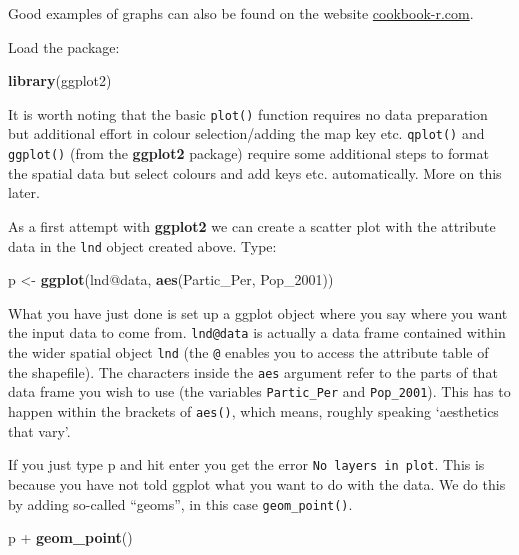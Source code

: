 \documentclass[]{article}
\newenvironment{Shaded}{}{}
\newcommand{\KeywordTok}[1]{\textcolor[rgb]{0.00,0.44,0.13}{\textbf{{#1}}}}
\newcommand{\StringTok}[1]{\textcolor[rgb]{0.25,0.44,0.63}{{#1}}}
\newcommand{\NormalTok}[1]{{#1}}
\begin{document}
Good examples of graphs can also be found on the website
\href{http://www.cookbook-r.com/Graphs/}{cookbook-r.com}.

Load the package:

\begin{Shaded}
\begin{Highlighting}[]
\KeywordTok{library}\NormalTok{(ggplot2)}
\end{Highlighting}
\end{Shaded}

It is worth noting that the basic \texttt{plot()} function requires no
data preparation but additional effort in colour selection/adding the
map key etc. \texttt{qplot()} and \texttt{ggplot()} (from the
\textbf{ggplot2} package) require some additional steps to format the
spatial data but select colours and add keys etc. automatically. More on
this later.

As a first attempt with \textbf{ggplot2} we can create a scatter plot
with the attribute data in the \texttt{lnd} object created above. Type:

\begin{Shaded}
\begin{Highlighting}[]
\NormalTok{p <-}\StringTok{ }\KeywordTok{ggplot}\NormalTok{(lnd@data, }\KeywordTok{aes}\NormalTok{(Partic_Per, Pop_2001))}
\end{Highlighting}
\end{Shaded}

What you have just done is set up a ggplot object where you say where
you want the input data to come from. \texttt{lnd@data} is actually a
data frame contained within the wider spatial object \texttt{lnd} (the
\texttt{@} enables you to access the attribute table of the shapefile).
The characters inside the \texttt{aes} argument refer to the parts of
that data frame you wish to use (the variables \texttt{Partic\_Per} and
\texttt{Pop\_2001}). This has to happen within the brackets of
\texttt{aes()}, which means, roughly speaking `aesthetics that vary'.

If you just type p and hit enter you get the error
\texttt{No layers in plot}. This is because you have not told ggplot
what you want to do with the data. We do this by adding so-called
``geoms'', in this case \texttt{geom\_point()}.

\begin{Shaded}
\begin{Highlighting}[]
\NormalTok{p +}\StringTok{ }\KeywordTok{geom_point}\NormalTok{()}
\end{Highlighting}
\end{Shaded}
\end{document}

